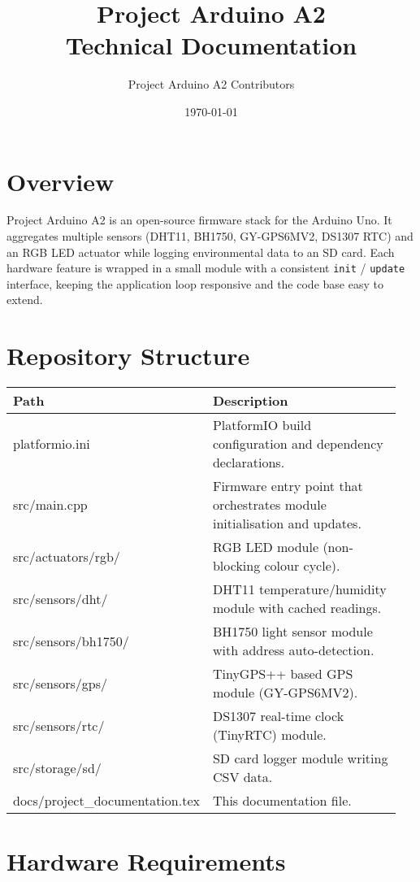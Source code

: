 \documentclass[11pt,a4paper]{article}
\title{Project Arduino A2\\Technical Documentation}
\author{Project Arduino A2 Contributors}
\date{\today}
\begin{document}
\maketitle

\tableofcontents
\newpage

\section{Overview}

Project Arduino A2 is an open-source firmware stack for the Arduino Uno. It aggregates multiple sensors (DHT11, BH1750, GY-GPS6MV2, DS1307 RTC) and an RGB LED actuator while logging environmental data to an SD card. Each hardware feature is wrapped in a small module with a consistent \texttt{init} / \texttt{update} interface, keeping the application loop responsive and the code base easy to extend.

\section{Repository Structure}

\begin{longtable}{>{\ttfamily}p{0.35\linewidth}p{0.6\linewidth}}
\textbf{Path} & \textbf{Description} \\
\hline
platformio.ini & PlatformIO build configuration and dependency declarations. \\
src/main.cpp & Firmware entry point that orchestrates module initialisation and updates. \\
src/actuators/rgb/ & RGB LED module (non-blocking colour cycle). \\
src/sensors/dht/ & DHT11 temperature/humidity module with cached readings. \\
src/sensors/bh1750/ & BH1750 light sensor module with address auto-detection. \\
src/sensors/gps/ & TinyGPS++ based GPS module (GY-GPS6MV2). \\
src/sensors/rtc/ & DS1307 real-time clock (TinyRTC) module. \\
src/storage/sd/ & SD card logger module writing CSV data. \\
docs/project\_documentation.tex & This documentation file. \\
\end{longtable}

\section{Hardware Requirements}
\end{document}

